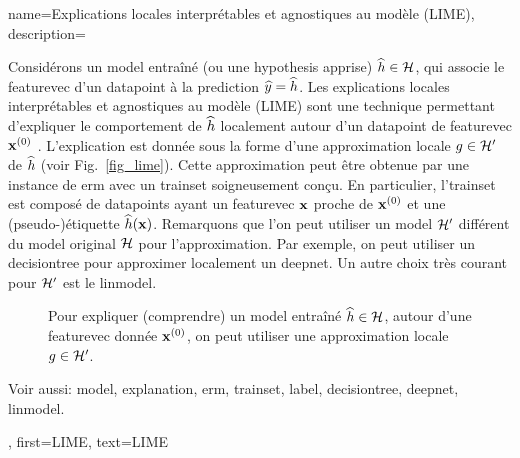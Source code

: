{
	name={Explications locales interprétables et agnostiques au modèle (LIME)},
	description={
		Considérons 
		un \gls{model} entraîné (ou une \gls{hypothesis} apprise) $\widehat{h} \in \mathcal{H}$, 
		qui associe le \gls{featurevec} d’un \gls{datapoint} à la \gls{prediction} $\widehat{y} = \widehat{h}$. 
		Les explications locales interprétables et agnostiques au modèle (LIME) sont une technique permettant 
		d’expliquer le comportement de $\widehat{h}$ localement autour d’un \gls{datapoint} de \gls{featurevec} ${\bf x}^{(0)}$ \cite{Ribeiro2016}. 
		L’explication est donnée sous la forme d’une approximation locale $g \in \mathcal{H}'$ de $\widehat{h}$ (voir Fig.\ \ref{fig_lime}). 
		Cette approximation peut être obtenue par une instance de \gls{erm} avec un \gls{trainset} soigneusement conçu. 
		En particulier, l'\gls{trainset} est composé de \glspl{datapoint} ayant un \gls{featurevec} ${\bf x}$ proche de ${\bf x}^{(0)}$ 
		et une (pseudo-)étiquette $\widehat{h}({\bf x})$. 
		Remarquons que l’on peut utiliser un \gls{model} $\mathcal{H}'$ différent du \gls{model} original $\mathcal{H}$ pour l’approximation. 
		Par exemple, on peut utiliser un \gls{decisiontree} pour approximer localement un \gls{deepnet}. 
		Un autre choix très courant pour $\mathcal{H}'$ est le \gls{linmodel}. 
		\begin{figure}[H]
			\begin{center}
			\end{center}
			\caption{Pour expliquer (comprendre) un \gls{model} entraîné $\widehat{h} \in \mathcal{H}$, autour d’une 
				\gls{featurevec} donnée ${\bf x}^{(0)}$, on peut utiliser une approximation locale $g \in \mathcal{H}'$.}
			\label{fig_lime_dict}
		\end{figure}
		Voir aussi: \gls{model}, \gls{explanation}, \gls{erm}, \gls{trainset}, \gls{label}, \gls{decisiontree}, \gls{deepnet}, \gls{linmodel}.},
		first={LIME},
		text={LIME}
	}

